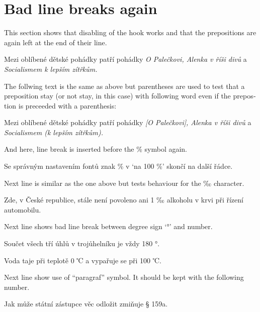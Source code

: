 \documentclass{article}
\newcommand{\expl}[1]{\begin{english}\sffamily #1\end{english}}
\begin{document}
\section{Bad line breaks again}
\expl{This section shows that disabling of the hook works and that the
  prepositions are again left at the end of their line.}

\cstypoSingleLetterDisable{}
\cstypoPercentsDisable{}
\cstypoALetterDisable{}
\cstypoParagraphDisable{}

Mezi oblíbené dětské pohádky patří pohádky \emph{O Palečkovi, Alenka v říši
  divů} a \emph{Socialismem k lepším zítřkům.}

\expl{The follwing text is the same as above but parentheses are used to test
  that a preposition stay (or not stay, in this case) with following word
  even if the prepostion is preceeded with a parenthesis:}

Mezi oblíbené dětské pohádky patří pohádky \emph{[O Palečkovi], Alenka v říši
  divů} a \emph{Socialismem (k lepším zítřkům).}

\expl{And here, line break is inserted before the \% symbol again.}

Se správným nastavením fontů znak \% v `na 100 \%' skončí na další řádce.

\expl{Next line is similar as the one above but tests behaviour for the ‰
  character.}

Zde, v České republice, stále není povoleno ani 1 ‰ alkoholu v krvi při
řízení automobilu.

\expl{Next line shows bad line break between degree sign `°' and number.}

Součet všech tří úhlů v trojůhelníku je vždy 180 °.

Voda taje při teplotě 0 ℃ a vypařuje se při 100 ℃.

\expl{Next line show use of ``paragraf'' symbol. It should be kept with the
  following number.}

Jak může státní zástupce věc odložit zmiňuje § 159a.
\end{document}
